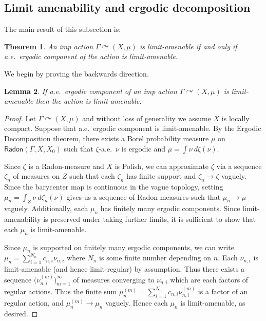 \documentclass[12pt]{article}
\theoremstyle{plain}
\newtheorem{thm}{Theorem}[section]
\newtheorem{lem}[thm]{Lemma}
\theoremstyle{definition}
\theoremstyle{remark}
\newcommand{\G}{\Gamma}
\newcommand\z{\zeta}
\newcommand\Radon{\mathsf{Radon}}
\def\cc{{\curvearrowright}}
\begin{document}

\subsection{Limit amenability and ergodic decomposition}

The main result of this subsection is:
\begin{thm}\label{C:limit-amen-erg-decomp2}
    An imp action $\G \cc (X,\mu)$ is limit-amenable if and only if a.e.\ ergodic component of the action is limit-amenable.
\end{thm}


We begin by proving the backwards direction. 
\begin{lem}\label{L:limit-ergodic1}
   If a.e.\ ergodic component of an imp action $\G \cc (X,\mu)$ is limit-amenable then the action  is limit-amenable.
\end{lem}


\begin{proof}

    Let $\G\cc(X,\mu)$ and without loss of generality we assume $X$ is locally compact. Suppose that a.e.~ergodic component is limit-amenable.
    By the Ergodic Decomposition theorem, there exists a Borel probability measure $\mu$ on $\Radon(\G, X, X_0)$ such that $\z$-a.e.\ $\nu$ is ergodic and $\mu = \int\nu~d\z(\nu)$.

    Since $\z$ is a Radon-measure and $X$ is Polish, we can approximate $\z$ via a sequence $\z_n$ of measures on $Z$ such that each $\z_n$ has finite support and $\z_n\to \z$ vaguely. Since the barycenter map is continuous in the vague topology, setting $\mu_n = \int_Z \nu~d\z_n(\nu)$ gives us a sequence of Radon measures such that $\mu_n \to \mu$ vaguely. Additionally, each $\mu_n$ has finitely many ergodic components. Since limit-amenability is preserved under taking further limits, it is sufficient to show that each $\mu_n$ is limit-amenable.

    Since $\mu_n$ is supported on finitely many ergodic components, we can write $\mu_n = \sum_{i=1}^{N_n}c_{n,i}\nu_{n,i}$ where $N_n$ is some finite number depending on $n$. Each $\nu_{n,i}$ is limit-amenable (and hence limit-regular) by assumption. Thus there exists a sequence $\big(\nu^{(m)}_{n,i}\big)_{m=1}^\infty$ of measures converging to $\nu_{n,i}$ which are each factors of regular actions. Thus the finite sum $\mu_n^{(m)} = \sum_{i=1}^{N_n}c_{n,i}\nu^{(m)}_{n,i}$ is a factor of an regular action, and $\mu_n^{(m)} \to \mu_n$ vaguely. 
    Hence each $\mu_n$ is limit-amenable, as desired. 
\end{proof}
\end{document}
